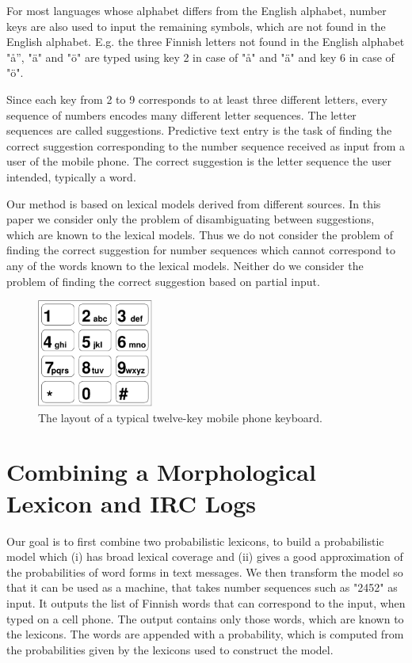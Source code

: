 \documentclass[a4paper,conference]{IEEEtran}
\begin{document}
For most languages whose alphabet differs from the English alphabet,
number keys are also used to input the remaining symbols, which are
not found in the English alphabet. E.g. the three Finnish letters not
found in the English alphabet "å'', "\"{a}" and "\"{o}" are typed
using key 2 in case of "å" and "\"{a}" and key 6 in case of "\"{o}".

Since each key from 2 to 9 corresponds to at least three different
letters, every sequence of numbers encodes many different letter
sequences. The letter sequences are called suggestions. Predictive
text entry is the task of finding the correct suggestion corresponding
to the number sequence received as input from a user of the mobile
phone. The correct suggestion is the letter sequence the user
intended, typically a word.

Our method is based on lexical models derived from different
sources. In this paper we consider only the problem of disambiguating
between suggestions, which are known to the lexical models. Thus we do
not consider the problem of finding the correct suggestion for number
sequences which cannot correspond to any of the words known to the
lexical models. Neither do we consider the problem of finding the
correct suggestion based on partial input.

\begin{figure}
\begin{center}
\includegraphics[width=1.5in]{keypad.pdf}
\end{center}
\caption{The layout of a typical twelve-key mobile phone keyboard.}
\label{fig:keypad}
\end{figure}

\section{Combining a Morphological Lexicon and IRC Logs}
\label{sec:methods}

Our goal is to first combine two probabilistic lexicons, to build a
probabilistic model which (i) has broad lexical coverage and (ii)
gives a good approximation of the probabilities of word forms in text
messages. We then transform the model so that it can be used as a
machine, that takes number sequences such as "2452" as input. It
outputs the list of Finnish words that can correspond to the input,
when typed on a cell phone. The output contains only those words,
which are known to the lexicons. The words are appended with a
probability, which is computed from the probabilities given by the
lexicons used to construct the model.
\end{document}

